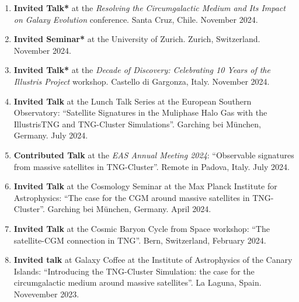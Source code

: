 \documentclass[a4paper,10pt,oneside]{article}
\begin{document}
\begin{enumerate}[wide, labelwidth=!, labelindent=-11pt, parsep=0pt]
    \item {\bf Invited Talk*} at the {\it Resolving the Circumgalactic Medium and Its Impact on Galaxy Evolution} conference. Santa Cruz, Chile. November 2024.
    \item {\bf Invited Seminar*} at the University of Zurich. Zurich, Switzerland. November 2024.
    \item {\bf Invited Talk*} at the {\it Decade of Discovery: Celebrating 10 Years of the Illustris Project} workshop. Castello di Gargonza, Italy. November 2024.
    \item {\bf Invited Talk} at the Lunch Talk Series at the European Southern Observatory: ``Satellite Signatures in the Muliphase Halo Gas with the IllustrisTNG and TNG-Cluster Simulations''. Garching bei M{\"u}nchen, Germany. July 2024.
    \item {\bf Contributed Talk} at the {\it EAS Annual Meeting 2024}: ``Observable signatures from massive satellites in TNG-Cluster''. Remote in Padova, Italy. July 2024.
    \item {\bf Invited Talk} at the Cosmology Seminar at the Max Planck Institute for Astrophysics: ``The case for the CGM around massive satellites in TNG-Cluster''. Garching bei M{\"u}nchen, Germany. April 2024.
    \item {\bf Invited Talk} at the Cosmic Baryon Cycle from Space workshop: ``The satellite-CGM connection in TNG''. Bern, Switzerland, February 2024.
    \item {\bf Invited talk} at Galaxy Coffee at the Institute of Astrophysics of the Canary Islands: ``Introducing the TNG-Cluster Simulation: the case for the circumgalactic medium around massive satellites''. La Laguna, Spain. Novevember 2023.

\end{enumerate}
\end{document}
